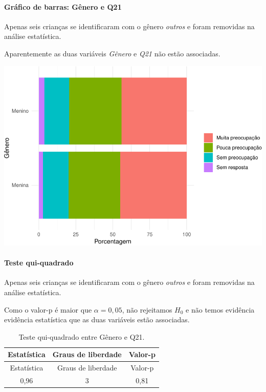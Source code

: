 \documentclass[]{article}
\let\oldparagraph\paragraph
\renewcommand{\paragraph}[1]{\oldparagraph{#1}\mbox{}}
\begin{document}
\hypertarget{gruxe1fico-de-barras-guxeanero-e-q21}{%
\paragraph{Gráfico de barras: Gênero e Q21}\label{gruxe1fico-de-barras-guxeanero-e-q21}}

Apenas seis crianças se identificaram com o gênero \emph{outros} e foram removidas na análise estatística.

Aparentemente as duas variáveis \emph{Gênero} e \emph{Q21} não estão associadas.

\begin{center}\includegraphics[width=0.75\linewidth]{relatorio_files/figure-latex/unnamed-chunk-334-1} \end{center}

\hypertarget{teste-qui-quadrado-38}{%
\paragraph{Teste qui-quadrado}\label{teste-qui-quadrado-38}}

Apenas seis crianças se identificaram com o gênero \emph{outros} e foram removidas na análise estatística.

Como o valor-p é maior que \(\alpha=0,05\), não rejeitamos \(H_0\) e não temos evidência evidência estatística que as duas variáveis estão associadas.

\begin{longtable}[]{@{}ccc@{}}
\caption{\label{tab:unnamed-chunk-335}Teste qui-quadrado entre Gênero e Q21.}\tabularnewline
\toprule
Estatística & Graus de liberdade & Valor-p\tabularnewline
\midrule
\endfirsthead
\toprule
Estatística & Graus de liberdade & Valor-p\tabularnewline
\midrule
\endhead
0,96 & 3 & 0,81\tabularnewline
\bottomrule
\end{longtable}
\end{document}

